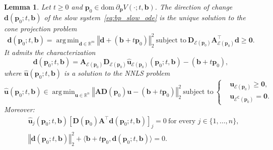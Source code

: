 \documentclass[11pt]{article}
\numberwithin{prop}{section}
\newtheorem{lem}{Lemma}[section]
\numberwithin{lem}{section}
\numberwithin{rem}{section}
\numberwithin{cor}{section}
\numberwithin{thm}{section}
\numberwithin{defn}{section}
\numberwithin{fact}{section}
\theoremstyle{plain}
\def\bb {\boldsymbol{b}}
\def\bd {\boldsymbol{d}}
\def\bp {\boldsymbol{p}}
\def\bu {\boldsymbol{u}}
\def\R {\mathbb{R}}
\newcommand{\normsq}[1]{\left\Vert{#1} \right\Vert_{2}^{2}}
\newcommand{\matr}[1]{\bm{#1}}
\def\dom {\mathrm{dom~}}    %
\def\Rn {\R^n}
\def\Rm {\R^m}
\DeclareMathOperator*{\argmin}{arg\,min}
\def\bpo {\bp_{0}}
\def\epo {\mathcal{E}(\bp_{0})}
\def\ecpo {\mathcal{E}^{\mathsf{C}}(\bp_{0})}
\def\Atop {\matr{A}^{\top}}
\begin{document}
\begin{lem}\label{lem:projection}
Let $t\geqslant 0$ and $\bpo \in \dom \partial_{\bp} V(\cdot;t,\bb)$. The direction of change $\bd(\bpo;t,\bb)$ of the slow system~\eqref{eq:bp_slow_ode} is the unique solution to the cone projection problem
\begin{equation}\label{eq:descent_cone}
\bd(\bpo;t,\bb) = \argmin_{\bd \in \Rm} \normsq{\bd + (\bb + t\bpo)} \ \text{subject to} \ \matr{D}_{\epo}\Atop_{\epo}\bd \geqslant \boldsymbol{0}.
\end{equation}
It admits the characterization
\begin{equation}\label{eq:proj_general}
\bd(\bpo;t,\bb) = \matr{A}_{\epo}\matr{D}_{\epo}\hat{\bu}_{\epo}(\bpo;t,\bb) - (\bb + t\bpo),
\end{equation}
where $\hat{\bu}(\bpo;t,\bb)$ is a solution to the NNLS problem
\begin{equation}\label{eq:nnls_problem}
\hat{\bu}(\bpo;t,\bb) \in \argmin_{\bu \in \Rn} \normsq{\matr{A}\matr{D}(\bpo)\bu - (\bb + t\bpo)} \ \text{subject to} \ 
\begin{cases}
&\bu_{\epo} \geqslant \boldsymbol{0}, \\
&\bu_{\ecpo} = \boldsymbol{0}.
\end{cases}
\end{equation}
Moreover:
\begin{subequations}
\begin{align}
&\hat{\bu}_{j}(\bpo;t,\bb)[\matr{D}(\bpo)\Atop\bd(\bpo;t,\bb)]_{j} = 0 \ \text{for every } j \in \{1,\dots,n\}, \label{eq:nnls_problem_oc_2} \\
&\normsq{\bd(\bpo;t,\bb)} + \langle \bb + t\bpo,\bd(\bpo;t,\bb)\rangle = 0. \label{eq:nnls_problem_oc_3}
\end{align}
\end{subequations}
\end{lem}
\end{document}
